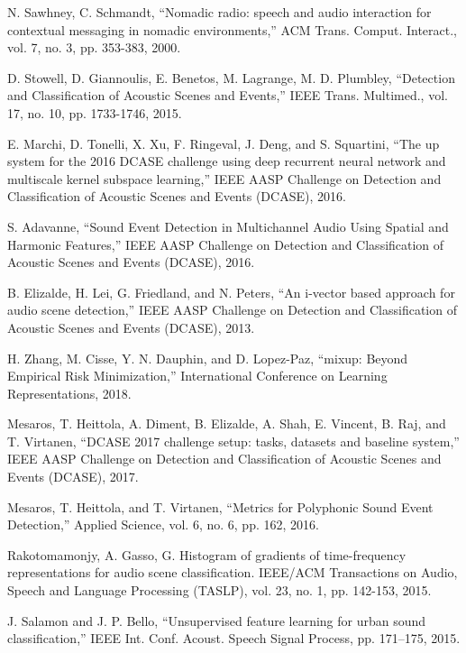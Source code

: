 \documentclass[conference]{IEEEtran}
\begin{document}
\begin{thebibliography}{00}
 N. Sawhney, C. Schmandt, ``Nomadic radio: speech and audio interaction for contextual messaging in nomadic environments,'' ACM Trans. Comput. Interact., vol. 7, no. 3, pp. 353-383, 2000.

 D. Stowell, D. Giannoulis, E. Benetos, M. Lagrange, M. D. Plumbley, ``Detection and Classification of Acoustic Scenes and Events,'' IEEE Trans. Multimed., vol. 17, no. 10, pp. 1733-1746, 2015.

 E. Marchi, D. Tonelli, X. Xu, F. Ringeval, J. Deng, and S. Squartini, ``The up system for the 2016 DCASE challenge using deep recurrent neural network and multiscale kernel subspace learning,'' IEEE AASP Challenge on Detection and Classification of Acoustic Scenes and Events (DCASE), 2016.

 S. Adavanne, ``Sound Event Detection in Multichannel Audio Using Spatial and Harmonic Features,'' IEEE AASP Challenge on Detection and Classification of Acoustic Scenes and Events (DCASE), 2016.

 B. Elizalde, H. Lei, G. Friedland, and N. Peters, ``An i-vector based approach for audio scene detection,'' IEEE AASP Challenge on Detection and Classification of Acoustic Scenes and Events (DCASE), 2013.

 H. Zhang, M. Cisse, Y. N. Dauphin, and D. Lopez-Paz, ``mixup: Beyond Empirical Risk Minimization,'' International Conference on Learning Representations, 2018.

 Mesaros, T. Heittola, A. Diment, B. Elizalde, A. Shah, E. Vincent, B. Raj, and T. Virtanen, ``DCASE 2017 challenge setup: tasks, datasets and baseline system,'' IEEE AASP Challenge on Detection and Classification of Acoustic Scenes and Events (DCASE), 2017.

 Mesaros, T. Heittola, and T. Virtanen, ``Metrics for Polyphonic Sound Event Detection,'' Applied Science, vol. 6, no. 6, pp. 162, 2016.

 Rakotomamonjy, A. Gasso, G. Histogram of gradients of time-frequency representations for audio scene classification. IEEE/ACM Transactions on Audio, Speech and Language Processing (TASLP), vol. 23, no. 1, pp. 142-153, 2015.

 J. Salamon and J. P. Bello, ``Unsupervised feature learning for urban sound classification,'' IEEE Int. Conf. Acoust. Speech Signal Process, pp. 171–175, 2015.


\end{thebibliography}
\end{document}

